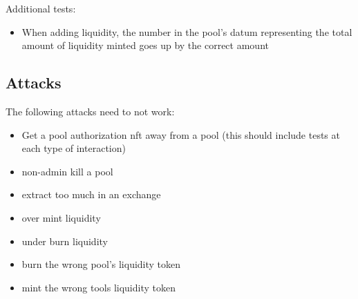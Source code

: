 \documentclass{article}
\begin{document}
Additional tests:
\begin{itemize}
  \item When adding liquidity, the number in the pool's datum representing the
    total amount of liquidity minted goes up by the correct amount
\end{itemize}

\subsection{Attacks}

The following attacks need to not work:
\begin{itemize}
  \item Get a pool authorization nft away from a pool (this should include tests at each type of interaction)
  \item non-admin kill a pool
  \item extract too much in an exchange
  \item over mint liquidity
  \item under burn liquidity
  \item burn the wrong pool’s liquidity token
  \item mint the wrong tools liquidity token
\end{itemize}
\end{document}
